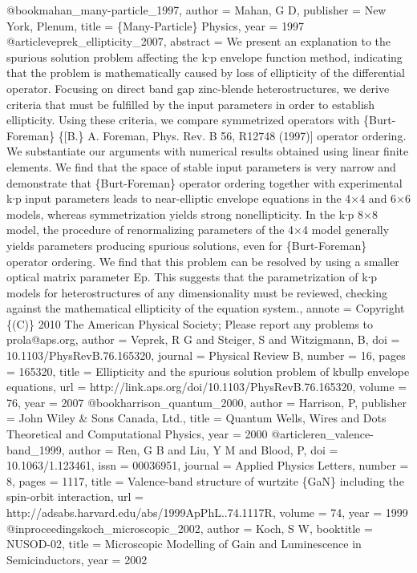 @book{mahan_many-particle_1997,
author = {Mahan, G D},
publisher = {New York, Plenum},
title = {{\{Many-Particle\} Physics}},
year = {1997}
}
@article{veprek_ellipticity_2007,
abstract = {We present an explanation to the spurious solution problem affecting the k∙p envelope function method, indicating that the problem is mathematically caused by loss of ellipticity of the differential operator. Focusing on direct band gap zinc-blende heterostructures, we derive criteria that must be fulfilled by the input parameters in order to establish ellipticity. Using these criteria, we compare symmetrized operators with \{Burt-Foreman\} \{[B.\} A. Foreman, Phys. Rev. B 56, R12748 (1997)] operator ordering. We substantiate our arguments with numerical results obtained using linear finite elements. We find that the space of stable input parameters is very narrow and demonstrate that \{Burt-Foreman\} operator ordering together with experimental k∙p input parameters leads to near-elliptic envelope equations in the 4×4 and 6×6 models, whereas symmetrization yields strong nonellipticity. In the k∙p 8×8 model, the procedure of renormalizing parameters of the 4×4 model generally yields parameters producing spurious solutions, even for \{Burt-Foreman\} operator ordering. We find that this problem can be resolved by using a smaller optical matrix parameter Ep. This suggests that the parametrization of k∙p models for heterostructures of any dimensionality must be reviewed, checking against the mathematical ellipticity of the equation system.},
annote = {Copyright \{(C)\} 2010 The American Physical Society; Please report any problems to prola@aps.org},
author = {Veprek, R G and Steiger, S and Witzigmann, B},
doi = {10.1103/PhysRevB.76.165320},
journal = {Physical Review B},
number = {16},
pages = {165320},
title = {{Ellipticity and the spurious solution problem of kbullp envelope equations}},
url = {http://link.aps.org/doi/10.1103/PhysRevB.76.165320},
volume = {76},
year = {2007}
}
@book{harrison_quantum_2000,
author = {Harrison, P},
publisher = {John Wiley \& Sons Canada, Ltd.},
title = {{Quantum Wells, Wires and Dots Theoretical and Computational Physics}},
year = {2000}
}
@article{ren_valence-band_1999,
author = {Ren, G B and Liu, Y M and Blood, P},
doi = {10.1063/1.123461},
issn = {00036951},
journal = {Applied Physics Letters},
number = {8},
pages = {1117},
title = {{Valence-band structure of wurtzite \{GaN\} including the spin-orbit interaction}},
url = {http://adsabs.harvard.edu/abs/1999ApPhL..74.1117R},
volume = {74},
year = {1999}
}
@inproceedings{koch_microscopic_2002,
author = {Koch, S W},
booktitle = {NUSOD-02},
title = {{Microscopic Modelling of Gain and Luminescence in Semicinductors}},
year = {2002}
}
